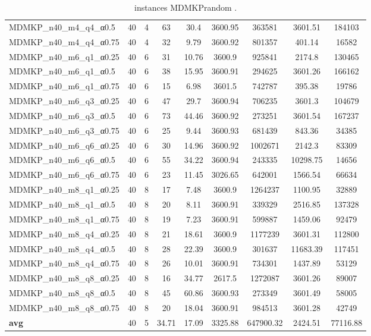 \begin{table}[!ht]
{\begin{tabular}{lcccccccc}
MDMKP\_n40\_m4\_q4\_α0.5 & 40 & 4 & 63 & 30.4 & 3600.95 & 363581 & 3601.51 & 184103 \\
MDMKP\_n40\_m4\_q4\_α0.75 & 40 & 4 & 32 & 9.79 & 3600.92 & 801357 & 401.14 & 16582 \\
MDMKP\_n40\_m6\_q1\_α0.25 & 40 & 6 & 31 & 10.76 & 3600.9 & 925841 & 2174.8 & 130465 \\
MDMKP\_n40\_m6\_q1\_α0.5 & 40 & 6 & 38 & 15.95 & 3600.91 & 294625 & 3601.26 & 166162 \\
MDMKP\_n40\_m6\_q1\_α0.75 & 40 & 6 & 15 & 6.98 & 3601.5 & 742787 & 395.38 & 19786 \\
MDMKP\_n40\_m6\_q3\_α0.25 & 40 & 6 & 47 & 29.7 & 3600.94 & 706235 & 3601.3 & 104679 \\
MDMKP\_n40\_m6\_q3\_α0.5 & 40 & 6 & 73 & 44.46 & 3600.92 & 273251 & 3601.54 & 167237 \\
MDMKP\_n40\_m6\_q3\_α0.75 & 40 & 6 & 25 & 9.44 & 3600.93 & 681439 & 843.36 & 34385 \\
MDMKP\_n40\_m6\_q6\_α0.25 & 40 & 6 & 30 & 14.96 & 3600.92 & 1002671 & 2142.3 & 83309 \\
MDMKP\_n40\_m6\_q6\_α0.5 & 40 & 6 & 55 & 34.22 & 3600.94 & 243335 & 10298.75 & 14656 \\
MDMKP\_n40\_m6\_q6\_α0.75 & 40 & 6 & 23 & 11.45 & 3026.65 & 642001 & 1566.54 & 66634 \\
MDMKP\_n40\_m8\_q1\_α0.25 & 40 & 8 & 17 & 7.48 & 3600.9 & 1264237 & 1100.95 & 32889 \\
MDMKP\_n40\_m8\_q1\_α0.5 & 40 & 8 & 20 & 8.11 & 3600.91 & 339329 & 2516.85 & 137328 \\
MDMKP\_n40\_m8\_q1\_α0.75 & 40 & 8 & 19 & 7.23 & 3600.91 & 599887 & 1459.06 & 92479 \\
MDMKP\_n40\_m8\_q4\_α0.25 & 40 & 8 & 21 & 18.61 & 3600.9 & 1177239 & 3601.31 & 112800 \\
MDMKP\_n40\_m8\_q4\_α0.5 & 40 & 8 & 28 & 22.39 & 3600.9 & 301637 & 11683.39 & 117451 \\
MDMKP\_n40\_m8\_q4\_α0.75 & 40 & 8 & 26 & 10.01 & 3600.91 & 734301 & 1437.89 & 53129 \\
MDMKP\_n40\_m8\_q8\_α0.25 & 40 & 8 & 16 & 34.77 & 2617.5 & 1272087 & 3601.26 & 89007 \\
MDMKP\_n40\_m8\_q8\_α0.5 & 40 & 8 & 45 & 60.86 & 3600.93 & 273349 & 3601.49 & 58005 \\
MDMKP\_n40\_m8\_q8\_α0.75 & 40 & 8 & 20 & 18.04 & 3600.91 & 984513 & 3601.28 & 42749 \\
\hline \textbf{avg} & 40 & 5 & 34.71 & 17.09 & 3325.88 & 647900.32 & 2424.51 & 77116.88 \\ \hline
\bottomrule
\end{tabular}
}%
\caption{ instances MDMKPrandom .}
\label{tab:table_compareBB_MDMKPrandom }
\end{table}
